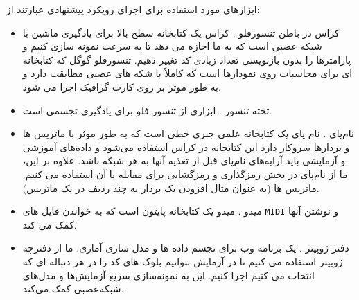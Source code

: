 ابزارهای مورد استفاده برای اجرای رویکرد پیشنهادی عبارتند از:
\begin{itemize}
\item کراس
 در باطن تنسورفلو
. کراس یک کتابخانه سطح بالا برای یادگیری ماشین با شبکه عصبی است
که به ما اجازه می دهد  تا به سرعت نمونه سازی کنیم و پارامترها را بدون بازنویسی تعداد زیادی کد تغییر دهیم.
تنسورفلو گوگل که کتابخانه ای برای محاسبات روی نمودارها است که کاملاً با شکه های عصبی مطابقت دارد و
به طور موثر بر روی کارت گرافیک اجرا می شود. 
\end{itemize}
\begin{itemize}
\item تخته تنسور
. ابزاری از تنسور فلو برای یادگیری تجسمی است.
\item نام‌پای
. نام پای یک کتابخانه علمی جبری خطی است که به طور موثر با ماتریس ها و بردارها سروکار دارد این کتابخانه در کراس استفاده می‌شود و داده‌های آموزشی و آزمایشی باید آرایه‌های نام‌پای قبل از تغذیه آنها به هر شبکه باشد.  علاوه بر این، ما از نام‌پای در بخش رمزگذاری و رمزگشایی برای مقابله با آن استفاده می کنیم. 
ماتریس ها (به عنوان مثال افزودن یک 
 بردار به چند ردیف در یک ماتریس).
\item میدو
. میدو یک کتابخانه پایتون است که به خواندن فایل های 
\verb;MIDI; 
و نوشتن آنها کمک می کند. 
\item  دفتر ژوپیتر
. یک برنامه وب برای تجسم داده ها و مدل سازی آماری.  ما از دفترچه ژوپیتر استفاده می کنیم
 تا در آزمایش
بتوانیم بلوک های کد را در هر دنباله ای که انتخاب می کنیم اجرا کنیم. این
به نمونه‌سازی سریع آزمایش‌ها و مدل‌های شبکه‌عصبی کمک می‌کند. 
\end{itemize}
